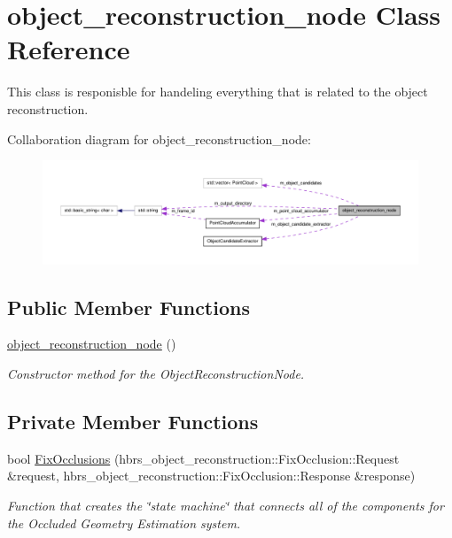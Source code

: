 \hypertarget{classobject__reconstruction__node}{\section{object\-\_\-reconstruction\-\_\-node \-Class \-Reference}
\label{classobject__reconstruction__node}
}


\-This class is responisble for handeling everything that is related to the object reconstruction.  




\-Collaboration diagram for object\-\_\-reconstruction\-\_\-node\-:\nopagebreak
\begin{figure}[H]
\begin{center}
\leavevmode
\includegraphics[width=350pt]{classobject__reconstruction__node__coll__graph}
\end{center}
\end{figure}
\subsection*{\-Public \-Member \-Functions}
\begin{DoxyCompactItemize}
\item 
\hyperlink{classobject__reconstruction__node_a6e45abbc296968691a0195ebcdf11fd0}{object\-\_\-reconstruction\-\_\-node} ()
\begin{DoxyCompactList}\small\item\em \-Constructor method for the \-Object\-Reconstruction\-Node. \end{DoxyCompactList}\end{DoxyCompactItemize}
\subsection*{\-Private \-Member \-Functions}
\begin{DoxyCompactItemize}
\item 
bool \hyperlink{classobject__reconstruction__node_ae6faada7785b1d2a84f605eb2c7bddea}{\-Fix\-Occlusions} (hbrs\-\_\-object\-\_\-reconstruction\-::\-Fix\-Occlusion\-::\-Request \&request, hbrs\-\_\-object\-\_\-reconstruction\-::\-Fix\-Occlusion\-::\-Response \&response)
\begin{DoxyCompactList}\small\item\em \-Function that creates the \char`\"{}state machine\char`\"{} that connects all of the components for the \-Occluded \-Geometry \-Estimation system. \end{DoxyCompactList}\end{DoxyCompactItemize}
